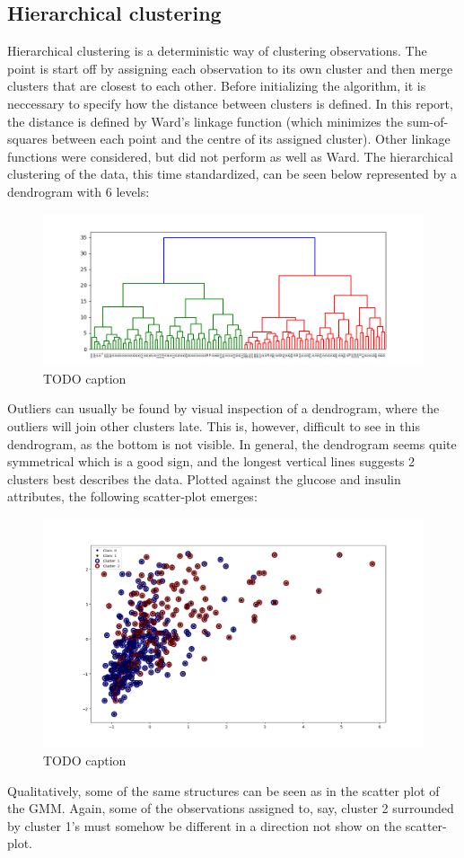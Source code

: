 \subsection{Hierarchical clustering}
Hierarchical clustering is a deterministic way of clustering observations. The
point is start off by assigning each observation to its own cluster and then
merge clusters that are closest to each other. Before initializing the algorithm,
it is neccessary to specify how the distance between clusters is defined. In this
report, the distance is defined by Ward's linkage function (which minimizes
the sum-of-squares between each point and the centre of its assigned cluster).
Other linkage functions were considered, but did not perform as well as Ward.
The hierarchical clustering of the data, this time standardized, can be seen
below represented by a dendrogram with 6 levels:\\
\begin{figure}[htbp]
  \centering
  \includegraphics[width=\textwidth]{Figure_3.png}
  \caption{TODO caption}
\end{figure}
Outliers can usually be found by visual inspection of a dendrogram, where the
outliers will join other clusters late. This is, however, difficult to see in
this dendrogram, as the bottom is not visible. In general, the dendrogram seems
quite symmetrical which is a good sign, and the longest vertical lines suggests
2 clusters best describes the data. Plotted against the glucose and insulin attributes,
the following scatter-plot emerges:\\
\begin{figure}[htbp]
  \centering
  \includegraphics[width=\textwidth]{Figure_4.png}
  \caption{TODO caption}
\end{figure}
Qualitatively, some of the same structures can be seen as in the scatter plot
of the GMM. Again, some of the observations assigned to, say, cluster 2
surrounded by cluster 1's must somehow be different in a direction not show
on the scatter-plot.

